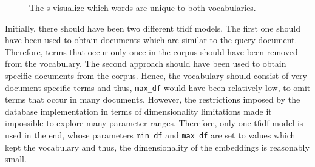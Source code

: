 \begin{figure}%
    \centering
    \qquad
    \caption[\wordcloud{}s for different \ac{tfidf} preprocessors]{The \wordcloud{}s visualize which words are unique to both vocabularies.}%
    \label{fig:differences-vocabularies}%
\end{figure}

Initially, there should have been two different \ac{tfidf} models.
The first one should have been used to obtain documents which are similar to the query document.
Therefore, terms that occur only once in the corpus should have been removed from the vocabulary.
The second approach should have been used to obtain specific documents from the corpus.
Hence, the vocabulary should consist of very document-specific terms and thus, \texttt{max\_df} would have been relatively low, to omit terms that occur in many documents.
However, the restrictions imposed by the database implementation in terms of dimensionality limitations
made it impossible to explore many parameter ranges.
Therefore, only one \ac{tfidf} model is used in the end, whose parameters \texttt{min\_df} and \texttt{max\_df} are set to values which kept the vocabulary and thus,
the dimensionality of the embeddings is reasonably small.
